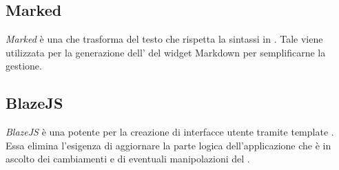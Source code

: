 \subsection{Marked}
\textit{Marked} è una  che trasforma del testo che rispetta la sintassi  in . Tale  viene utilizzata per la generazione dell' del widget Markdown per semplificarne la gestione. 

\subsection{BlazeJS}
\textit{BlazeJS} è una potente  per la creazione di interfacce utente tramite template . Essa elimina l'esigenza di aggiornare la parte logica dell'applicazione che è in ascolto dei cambiamenti e di eventuali manipolazioni del .